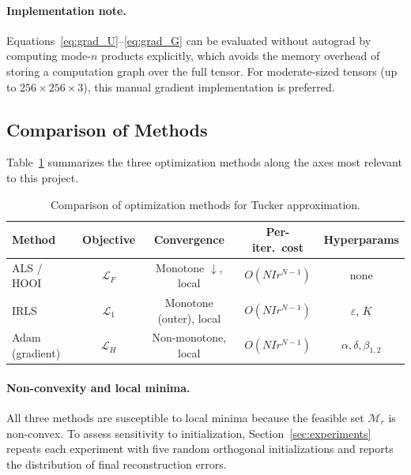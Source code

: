 \paragraph{Implementation note.}
Equations~\eqref{eq:grad_U}--\eqref{eq:grad_G} can be evaluated without
autograd by computing mode-$n$ products explicitly, which avoids the
memory overhead of storing a computation graph over the full tensor.
For moderate-sized tensors (up to $256 \times 256 \times 3$), this
manual gradient implementation is preferred.

\subsection{Comparison of Methods}
\label{subsec:opt_comparison}

Table~\ref{tab:opt_comparison} summarizes the three optimization methods
along the axes most relevant to this project.

\begin{table}[h]
  \centering
  \caption{Comparison of optimization methods for Tucker approximation.}
  \label{tab:opt_comparison}
  \begin{tabular}{lcccc}
    \toprule
    Method & Objective & Convergence & Per-iter.\ cost & Hyperparams \\
    \midrule
    ALS / HOOI
      & $\mathcal{L}_F$
      & Monotone $\downarrow$, local
      & $O(N I r^{N-1})$
      & none \\
    IRLS
      & $\mathcal{L}_1$
      & Monotone (outer), local
      & $O(N I r^{N-1})$
      & $\varepsilon$, $K$ \\
    Adam (gradient)
      & $\mathcal{L}_H$
      & Non-monotone, local
      & $O(N I r^{N-1})$
      & $\alpha, \delta, \beta_{1,2}$ \\
    \bottomrule
  \end{tabular}
\end{table}

      \paragraph{Non-convexity and local minima.}
        All three methods are susceptible to local minima because the feasible set $\mathcal{M}_r$ is non-convex. To assess sensitivity to initialization, Section~\ref{sec:experiments} repeats each experiment with five random orthogonal initializations and reports the distribution of final reconstruction errors.\\


